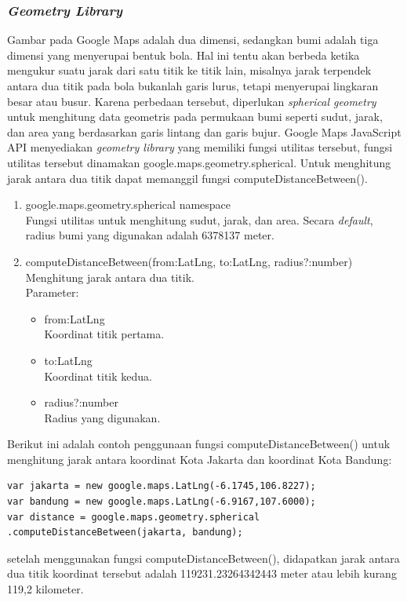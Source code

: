 \subsubsection{\textit{Geometry Library}}
Gambar pada Google Maps adalah dua dimensi, sedangkan bumi adalah tiga dimensi
yang menyerupai bentuk bola. Hal ini tentu akan berbeda ketika mengukur suatu
jarak dari satu titik ke titik lain, misalnya jarak terpendek antara dua titik 
pada bola bukanlah garis lurus, tetapi menyerupai lingkaran besar atau busur. 
Karena perbedaan tersebut, diperlukan \textit{spherical geometry} untuk
menghitung data geometris pada permukaan bumi seperti sudut, jarak, dan area 
yang berdasarkan garis lintang dan garis bujur. Google Maps JavaScript API 
menyediakan \textit{geometry library} yang memiliki fungsi utilitas tersebut,
fungsi utilitas tersebut dinamakan google.maps.geometry.spherical. Untuk
menghitung jarak antara dua titik dapat memanggil fungsi
computeDistanceBetween().
\begin{enumerate}
  \item google.maps.geometry.spherical namespace \\
  Fungsi utilitas untuk menghitung sudut, jarak, dan area. Secara
  \textit{default}, radius bumi yang digunakan adalah 6378137 meter.
  
  \item computeDistanceBetween(from:LatLng, to:LatLng, radius?:number) \\
  Menghitung jarak antara dua titik.\\
  Parameter:
  \begin{itemize}
    \item from:LatLng\\
    Koordinat titik pertama.
    
    \item to:LatLng\\
    Koordinat titik kedua.
    
    \item radius?:number\\
    Radius yang digunakan.
  \end{itemize}
\end{enumerate}
Berikut ini adalah contoh penggunaan fungsi computeDistanceBetween() untuk
menghitung jarak antara koordinat Kota Jakarta dan koordinat Kota Bandung:
\begin{verbatim}
var jakarta = new google.maps.LatLng(-6.1745,106.8227);
var bandung = new google.maps.LatLng(-6.9167,107.6000);
var distance = google.maps.geometry.spherical
.computeDistanceBetween(jakarta, bandung);
\end{verbatim}
setelah menggunakan fungsi computeDistanceBetween(), didapatkan jarak antara dua
titik koordinat tersebut adalah 119231.23264342443 meter atau lebih kurang
119,2 kilometer.
 
